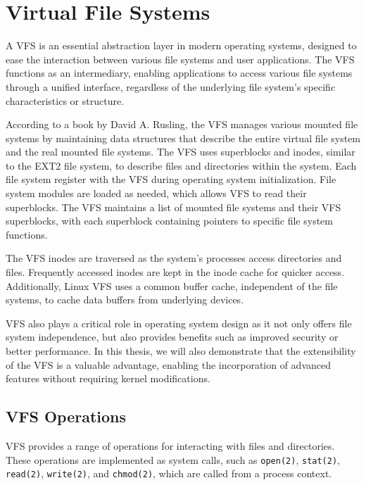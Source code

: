 \section{Virtual File Systems}\label{sec:virtual-file-systems}

A VFS is an essential abstraction layer in modern operating systems, designed to ease the interaction between various file systems and user applications.
The VFS functions as an intermediary, enabling applications to access various file systems through a unified interface, regardless of the underlying file system's specific characteristics or structure.

According to a book by David A. Rusling\cite{rusling-linux}, the VFS manages various mounted file systems by maintaining data structures that describe the entire virtual file system and the real mounted file systems.
The VFS uses superblocks and inodes, similar to the EXT2 file system, to describe files and directories within the system.
Each file system register with the VFS during operating system initialization.
File system modules are loaded as needed, which allows VFS to read their superblocks.
The VFS maintains a list of mounted file systems and their VFS superblocks, with each superblock containing pointers to specific file system functions.

The VFS inodes are traversed as the system's processes access directories and files.
Frequently accessed inodes are kept in the inode cache for quicker access.
Additionally, Linux VFS uses a common buffer cache, independent of the file systems, to cache data buffers from underlying devices.

VFS also plays a critical role in operating system design as it not only offers file system independence, but also provides benefits such as improved security or better performance.
In this thesis, we will also demonstrate that the extensibility of the VFS is a valuable advantage, enabling the incorporation of advanced features without requiring kernel modifications.

\subsection{VFS Operations}\label{subsec:vfs-operations}

VFS provides a range of operations for interacting with files and directories.
These operations are implemented as system calls, such as \texttt{open(2)}, \texttt{stat(2)}, \texttt{read(2)}, \texttt{write(2)}, and \texttt{chmod(2)}, which are called from a process context.


